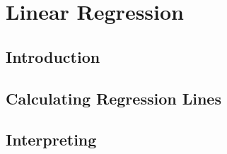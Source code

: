 \documentclass[../alevelmaths.tex]{subfiles}
\begin{document}
\chapter{Linear Regression}
\section{Introduction}
\section{Calculating Regression Lines}
\section{Interpreting}
\end{document}
